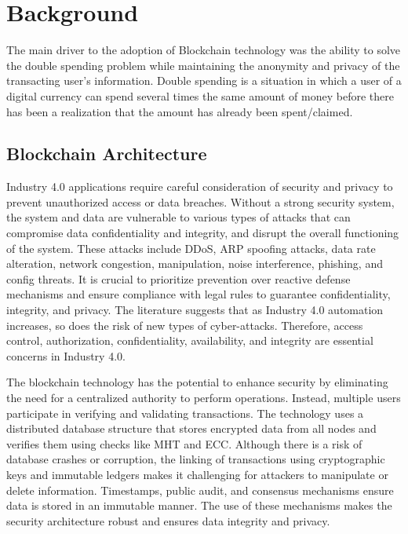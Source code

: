 \chapter{Background}\label{chap:background}
  The main driver to the adoption of Blockchain technology was the ability to solve the double spending problem while maintaining the anonymity and privacy of the transacting user’s information. Double spending is a situation in which a user of a digital currency can spend several times the same amount of money before there has been a realization that the amount has already been spent/claimed.


\section{Blockchain Architecture}
Industry 4.0 applications require careful consideration of security and privacy to prevent unauthorized access or data breaches. Without a strong security system, the system and data are vulnerable to various types of attacks that can compromise data confidentiality and integrity, and disrupt the overall functioning of the system. These attacks include \ac{DDoS}, \ac{ARP} spoofing attacks, data rate alteration, network congestion, manipulation, noise interference, phishing, and config threats. It is crucial to prioritize prevention over reactive defense mechanisms and ensure compliance with legal rules to guarantee confidentiality, integrity, and privacy. The literature suggests that as Industry 4.0 automation increases, so does the risk of new types of cyber-attacks. Therefore, access control, authorization, confidentiality, availability, and integrity are essential concerns in Industry 4.0.

The blockchain technology has the potential to enhance security by eliminating the need for a centralized authority to perform operations. Instead, multiple users participate in verifying and validating transactions. The technology uses a distributed database structure that stores encrypted data from all nodes and verifies them using checks like \ac{MHT} and \ac{ECC}. Although there is a risk of database crashes or corruption, the linking of transactions using cryptographic keys and immutable ledgers makes it challenging for attackers to manipulate or delete information. Timestamps, public audit, and consensus mechanisms ensure data is stored in an immutable manner. The use of these mechanisms makes the security architecture robust and ensures data integrity and privacy.

